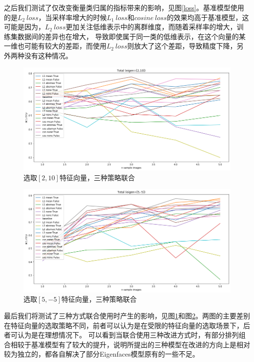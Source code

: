 \documentclass{ctexart}
\begin{document}
之后我们测试了仅改变衡量类归属的指标带来的影响，见图\ref{loss}。基准模型使用的是$L_2 \ loss$，当采样率增大的时候$L_1 \ loss$和$cosine \ loss$的效果均高于基准模型，这可能是因为，$L_2 \ loss$更加关注低维表示中的离群维度，而随着采样率的增大，训练集数据间的差异也在增大，
导致即使属于同一类的低维表示，在这个向量的某一维也可能有较大的差距，而使用$L_2 \ loss$则放大了这个差距，导致精度下降，另外两种没有这种情况。

\begin{figure}[htbp]
    \centering
    \includegraphics[scale=0.45]{imgs/total1.png}
    \caption{选取$[2,10]$特征向量，三种策略联合}
    \label{total1}
\end{figure}
\begin{figure}[htbp]
    \centering
    \includegraphics[scale=0.45]{imgs/total2.png}
    \caption{选取$[5,-5]$特征向量，三种策略联合}
    \label{total2}
\end{figure}

最后我们将测试了三种方式联合使用时产生的影响，见图\ref{total1}和图\ref{total2}。两图的主要差别在特征向量的选取策略不同，前者可以认为是在受限的特征向量的选取场景下，后者可认为是在理想情况下。
可以看到当联合使用三种改进方式时，有部分排列组合相较于基准模型有了较大的提升，说明所提出的三种模型在改进的方向上是相对较为独立的，都各自解决了部分Eigenfaces模型原有的一些不足。
\end{document}
